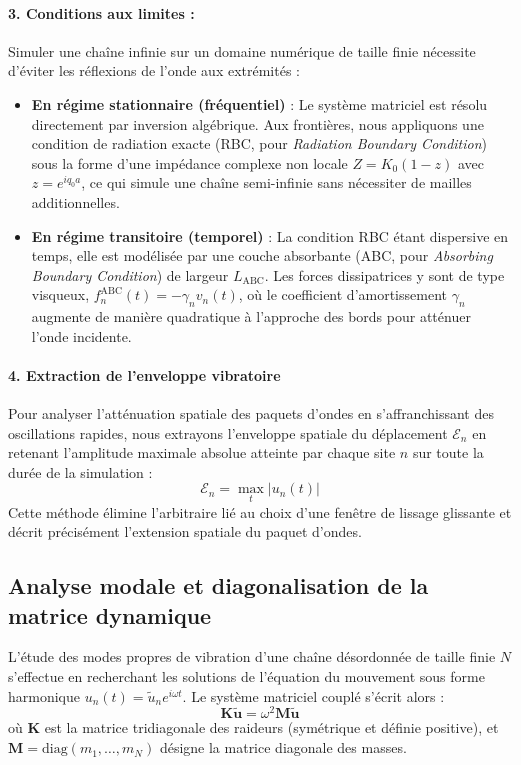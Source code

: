 \paragraph{3. Conditions aux limites :}
Simuler une chaîne infinie sur un domaine numérique de taille finie nécessite d'éviter les réflexions de l'onde aux extrémités :
\begin{itemize}
    \item \textbf{En régime stationnaire (fréquentiel)} : Le système matriciel est résolu directement par inversion algébrique. Aux frontières, nous appliquons une condition de radiation exacte (RBC, pour \textit{Radiation Boundary Condition}) sous la forme d'une impédance complexe non locale $Z = K_0(1-z)$ avec $z=e^{i q_0 a}$, ce qui simule une chaîne semi-infinie sans nécessiter de mailles additionnelles.
    \item \textbf{En régime transitoire (temporel)} : La condition RBC étant dispersive en temps, elle est modélisée par une couche absorbante (ABC, pour \textit{Absorbing Boundary Condition}) de largeur $L_{\text{ABC}}$. Les forces dissipatrices y sont de type visqueux, $f^{\text{ABC}}_n(t) = -\gamma_n v_n(t)$, où le coefficient d'amortissement $\gamma_n$ augmente de manière quadratique à l'approche des bords pour atténuer l'onde incidente.
\end{itemize}

\paragraph{4. Extraction de l'enveloppe vibratoire}
Pour analyser l'atténuation spatiale des paquets d'ondes en s'affranchissant des oscillations rapides, nous extrayons l'enveloppe spatiale du déplacement $\mathcal{E}_n$ en retenant l'amplitude maximale absolue atteinte par chaque site $n$ sur toute la durée de la simulation :
\begin{equation*}
    \mathcal{E}_n = \max_{t} |u_n(t)|
\end{equation*}
Cette méthode élimine l'arbitraire lié au choix d'une fenêtre de lissage glissante et décrit précisément l'extension spatiale du paquet d'ondes.

\subsection{Analyse modale et diagonalisation de la matrice dynamique}

L'étude des modes propres de vibration d'une chaîne désordonnée de taille finie $N$ s'effectue en recherchant les solutions de l'équation du mouvement sous forme harmonique $u_n(t) = \tilde{u}_n e^{i\omega t}$. Le système matriciel couplé s'écrit alors :
\begin{equation*}
    \mathbf{K} \tilde{\mathbf{u}} = \omega^2 \mathbf{M} \tilde{\mathbf{u}}
\end{equation*}
où $\mathbf{K}$ est la matrice tridiagonale des raideurs (symétrique et définie positive), et $\mathbf{M} = \text{diag}(m_1, \dots, m_N)$ désigne la matrice diagonale des masses.

